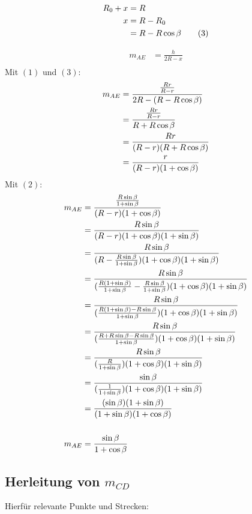 \begin{align*}
	R_0 + x &= R \\
	x &= R - R_0 \\
	&= R - R \cos\beta \tag{3}
\end{align*}

\begin{samepage}
	\begin{align*}
		m_{AE} &= \frac{h}{2R - x} \\
	\end{align*}
	Mit $(1)$ und $(3)$: \nopagebreak
	\begin{align*}
		m_{AE} &= \frac{\frac{Rr}{R-r}}{2R - (R-R \cos\beta)} \\
		&= \frac{\frac{Rr}{R-r}}{R+R \cos\beta} \\
		&= \frac{Rr}{(R-r)(R+R \cos\beta)} \\
		&= \frac{r}{(R-r)(1+\cos\beta)}
	\end{align*}
	Mit $(2)$: \nopagebreak
	\begin{align*}
		m_{AE} &= \frac{\frac{R \sin\beta}{1+\sin\beta}}{(R-r)(1+\cos\beta)} \\
		&= \frac{R \sin\beta}{(R-r)(1+\cos\beta)(1+\sin\beta)} \\
		&= \frac{R \sin\beta}{(R-\frac{R \sin\beta}{1+\sin\beta})(1+\cos\beta)(1+\sin\beta)} \\
		&= \frac{R \sin\beta}{(\frac{R(1+\sin\beta)}{1+\sin\beta}-\frac{R \sin\beta}{1+\sin\beta})(1+\cos\beta)(1+\sin\beta)} \\
		&= \frac{R \sin\beta}{(\frac{R(1+\sin\beta) - R\sin\beta}{1+\sin\beta})(1+\cos\beta)(1+\sin\beta)} \\
		&= \frac{R \sin\beta}{(\frac{R+R\sin\beta-R\sin\beta}{1+\sin\beta})(1+\cos\beta)(1+\sin\beta)} \\
		&= \frac{R \sin\beta}{(\frac{R}{1+\sin\beta})(1+\cos\beta)(1+\sin\beta)} \\
		&= \frac{\sin\beta}{(\frac{1}{1+\sin\beta})(1+\cos\beta)(1+\sin\beta)} \\
		&= \frac{(\sin\beta)(1+\sin\beta)}{(1+\sin\beta)(1+\cos\beta)} \\[15pt]
		m_{AE} &= \frac{\sin\beta}{1+\cos\beta}
	\end{align*}
\end{samepage}

\pagebreak
\subsection[]{Herleitung von $m_{CD}$}
Hierfür relevante Punkte und Strecken:

